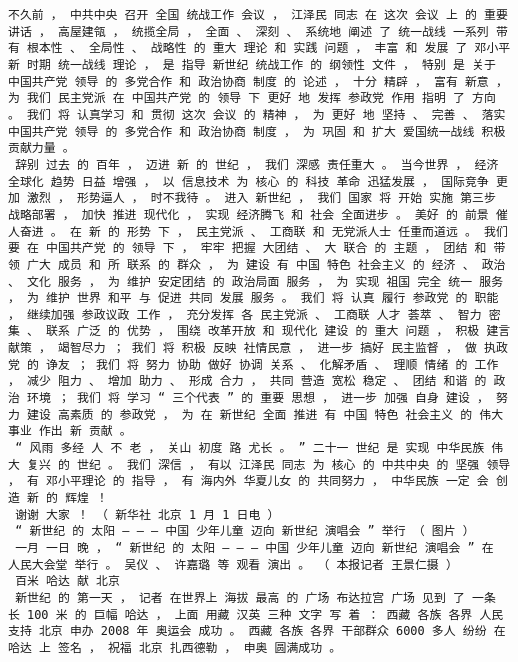 \documentclass{article}
\begin{document}
\begin{Verbatim}[commandchars=\\\{\}]
 不久前 ， 中共中央 召开 全国 统战工作 会议 ， 江泽民 同志 在 这次 会议 上 的 重要讲话 ， 高屋建瓴 ， 统揽全局 ， 全面 、 深刻 、 系统地 阐述 了 统一战线 一系列 带有 根本性 、 全局性 、 战略性 的 重大 理论 和 实践 问题 ， 丰富 和 发展 了 邓小平 新 时期 统一战线 理论 ， 是 指导 新世纪 统战工作 的 纲领性 文件 ， 特别 是 关于 中国共产党 领导 的 多党合作 和 政治协商 制度 的 论述 ， 十分 精辟 ， 富有 新意 ， 为 我们 民主党派 在 中国共产党 的 领导 下 更好 地 发挥 参政党 作用 指明 了 方向 。 我们 将 认真学习 和 贯彻 这次 会议 的 精神 ， 为 更好 地 坚持 、 完善 、 落实 中国共产党 领导 的 多党合作 和 政治协商 制度 ， 为 巩固 和 扩大 爱国统一战线 积极 贡献力量 。 
 辞别 过去 的 百年 ， 迈进 新 的 世纪 ， 我们 深感 责任重大 。 当今世界 ， 经济 全球化 趋势 日益 增强 ， 以 信息技术 为 核心 的 科技 革命 迅猛发展 ， 国际竞争 更加 激烈 ， 形势逼人 ， 时不我待 。 进入 新世纪 ， 我们 国家 将 开始 实施 第三步 战略部署 ， 加快 推进 现代化 ， 实现 经济腾飞 和 社会 全面进步 。 美好 的 前景 催人奋进 。 在 新 的 形势 下 ， 民主党派 、 工商联 和 无党派人士 任重而道远 。 我们 要 在 中国共产党 的 领导 下 ， 牢牢 把握 大团结 、 大 联合 的 主题 ， 团结 和 带领 广大 成员 和 所 联系 的 群众 ， 为 建设 有 中国 特色 社会主义 的 经济 、 政治 、 文化 服务 ， 为 维护 安定团结 的 政治局面 服务 ， 为 实现 祖国 完全 统一 服务 ， 为 维护 世界 和平 与 促进 共同 发展 服务 。 我们 将 认真 履行 参政党 的 职能 ， 继续加强 参政议政 工作 ， 充分发挥 各 民主党派 、 工商联 人才 荟萃 、 智力 密集 、 联系 广泛 的 优势 ， 围绕 改革开放 和 现代化 建设 的 重大 问题 ， 积极 建言献策 ， 竭智尽力 ； 我们 将 积极 反映 社情民意 ， 进一步 搞好 民主监督 ， 做 执政党 的 诤友 ； 我们 将 努力 协助 做好 协调 关系 、 化解矛盾 、 理顺 情绪 的 工作 ， 减少 阻力 、 增加 助力 、 形成 合力 ， 共同 营造 宽松 稳定 、 团结 和谐 的 政治 环境 ； 我们 将 学习 “ 三个代表 ” 的 重要 思想 ， 进一步 加强 自身 建设 ， 努力 建设 高素质 的 参政党 ， 为 在 新世纪 全面 推进 有 中国 特色 社会主义 的 伟大事业 作出 新 贡献 。 
 “ 风雨 多经 人 不 老 ， 关山 初度 路 尤长 。 ” 二十一 世纪 是 实现 中华民族 伟大 复兴 的 世纪 。 我们 深信 ， 有以 江泽民 同志 为 核心 的 中共中央 的 坚强 领导 ， 有 邓小平理论 的 指导 ， 有 海内外 华夏儿女 的 共同努力 ， 中华民族 一定 会 创造 新 的 辉煌 ！ 
 谢谢 大家 ！ （ 新华社 北京 1 月 1 日电 ） 
 “ 新世纪 的 太阳 — — — 中国 少年儿童 迈向 新世纪 演唱会 ” 举行 （ 图片 ） 
 一月 一日 晚 ， “ 新世纪 的 太阳 — — — 中国 少年儿童 迈向 新世纪 演唱会 ” 在 人民大会堂 举行 。 吴仪 、 许嘉璐 等 观看 演出 。 （ 本报记者 王景仁摄 ） 
 百米 哈达 献 北京 
 新世纪 的 第一天 ， 记者 在世界上 海拔 最高 的 广场 布达拉宫 广场 见到 了 一条 长 100 米 的 巨幅 哈达 ， 上面 用藏 汉英 三种 文字 写 着 ： 西藏 各族 各界 人民 支持 北京 申办 2008 年 奥运会 成功 。 西藏 各族 各界 干部群众 6000 多人 纷纷 在 哈达 上 签名 ， 祝福 北京 扎西德勒 ， 申奥 圆满成功 。 

\end{Verbatim}
\end{document}
